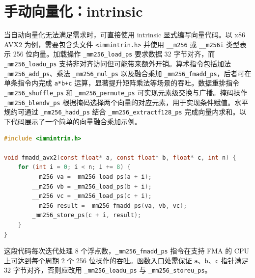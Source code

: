 \chapter{手动向量化：intrinsic}
当自动向量化无法满足需求时，可直接使用 intrinsic 显式编写向量代码。以 x86 AVX2 为例，需要包含头文件 \texttt{<immintrin.h>} 并使用 \texttt{\_{}\_{}m256} 或 \texttt{\_{}\_{}m256i} 类型表示 256 位向量。加载操作 \texttt{\_{}mm256\_{}load\_{}ps} 要求数据 32 字节对齐，而 \texttt{\_{}mm256\_{}loadu\_{}ps} 支持非对齐访问但可能带来额外开销。算术指令包括加法 \texttt{\_{}mm256\_{}add\_{}ps}、乘法 \texttt{\_{}mm256\_{}mul\_{}ps} 以及融合乘加 \texttt{\_{}mm256\_{}fmadd\_{}ps}，后者可在单条指令内完成 \texttt{a*b+c} 运算，显著提升矩阵乘法等场景的吞吐。数据重排指令 \texttt{\_{}mm256\_{}shuffle\_{}ps} 和 \texttt{\_{}mm256\_{}permute\_{}ps} 可实现元素级交换与广播。掩码操作 \texttt{\_{}mm256\_{}blendv\_{}ps} 根据掩码选择两个向量的对应元素，用于实现条件赋值。水平规约可通过 \texttt{\_{}mm256\_{}hadd\_{}ps} 结合 \texttt{\_{}mm256\_{}extractf128\_{}ps} 完成向量内求和。以下代码展示了一个简单的向量融合乘加示例。\par
\begin{lstlisting}[language=c]
#include <immintrin.h>

void fmadd_avx2(const float* a, const float* b, float* c, int n) {
    for (int i = 0; i < n; i += 8) {
        __m256 va = _mm256_load_ps(a + i);
        __m256 vb = _mm256_load_ps(b + i);
        __m256 vc = _mm256_load_ps(c + i);
        __m256 result = _mm256_fmadd_ps(va, vb, vc);
        _mm256_store_ps(c + i, result);
    }
}
\end{lstlisting}
这段代码每次迭代处理 8 个浮点数，\texttt{\_{}mm256\_{}fmadd\_{}ps} 指令在支持 FMA 的 CPU 上可达到每个周期 2 个 256 位操作的吞吐。函数入口处需保证 \texttt{a}、\texttt{b}、\texttt{c} 指针满足 32 字节对齐，否则应改用 \texttt{\_{}mm256\_{}loadu\_{}ps} 与 \texttt{\_{}mm256\_{}storeu\_{}ps}。\par
